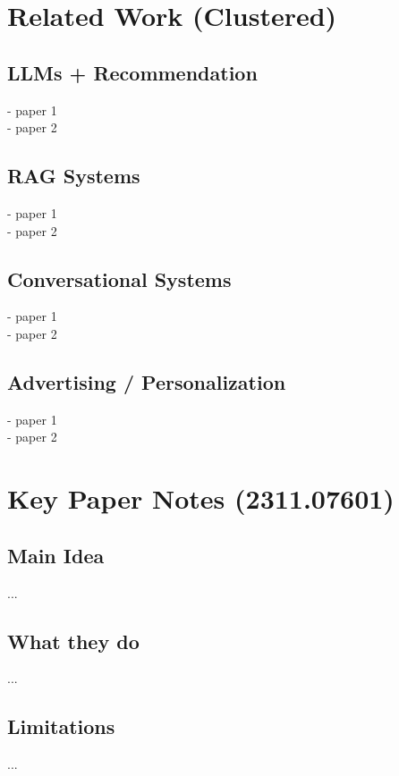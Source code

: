 \documentclass{article}
\begin{document}
\section{Related Work (Clustered)}

\subsection{LLMs + Recommendation}
- paper 1 \\
- paper 2 \\

\subsection{RAG Systems}
- paper 1 \\
- paper 2 \\

\subsection{Conversational Systems}
- paper 1 \\
- paper 2 \\

\subsection{Advertising / Personalization}
- paper 1 \\
- paper 2 \\

\newpage 

\section{Key Paper Notes (2311.07601)}

\subsection{Main Idea}
...

\subsection{What they do}
...

\subsection{Limitations}
...
\end{document}
